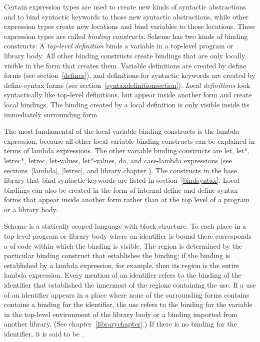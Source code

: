 

\vest Certain expression types are used to create new kinds of
syntactic abstractions
and to bind syntactic keywords to those new syntactic abstractions, while other
expression types create new locations and bind variables to those
locations.  These expression types are called {\em binding
  constructs}. Scheme has two kinds of
binding constructs: A \textit{top-level
  definition} binds a
variable in a top-level program or library body.  All other binding
constructs create bindings that are only locally visible in the form
that creates them.  Variable definitions are created by {\cf define}
forms (see section~\ref{defines}), and definitions for syntactic
keywords are created by {\cf define-syntax} forms (see
section~\ref{syntaxdefinitionsection}).  \textit{Local
  definitions} look syntactically like
top-level definitions, but appear inside another form and create local
bindings.  The binding created by a local definition is only visible
inside its immediately surrounding form.

The most fundamental of the local variable binding constructs is the
{\cf lambda} expression, because all other local variable binding
constructs can be explained in terms of {\cf lambda} expressions.  The
other variable binding constructs are {\cf let}, {\cf let*}, {\cf
  letrec*}, {\cf letrec}, {\cf let-values}, {\cf let*-values}, {\cf
  do}, and {\cf case-lambda} expressions (see sections~\ref{lambda},
\ref{letrec}, and library chapter
).
The constructs in the base library that bind syntactic keywords are
listed in section~\ref{bindsyntax}.  Local bindings can
also be created in the form of internal {\cf define} and {\cf
  define-syntax} forms that appear inside another form rather than at
the top level of a program or a library body.

\vest Scheme is a statically scoped language with
block structure.  To each place in a top-level program or library body where an identifier is bound 
there corresponds a  of code within which
the binding is visible.  The region is determined by the particular
binding construct that establishes the binding; if the binding is
established by a {\cf lambda} expression, for example, then its region
is the entire {\cf lambda} expression.  Every mention of an identifier
refers to the binding of the identifier that established the
innermost of the regions containing the use.  If a use of an
identifier appears in a place where none of the surrounding forms
contains contains a binding for the identifier, the use refers to the
binding for the variable in the top-level environment of the library
body or a binding imported from another library.  (See
chapter~\ref{librarychapter}.)
If there is no binding for the identifier,
it is said to be .

